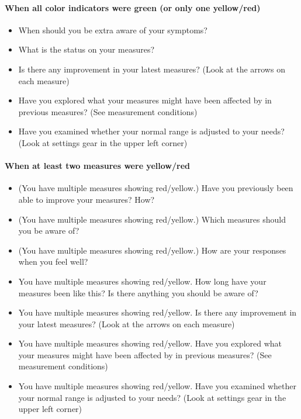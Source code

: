 \paragraph{When all color indicators were green (or only one yellow/red)}
\begin{itemize}
\item When should you be extra aware of your symptoms?
\item What is the status on your measures?
\item Is there any improvement in your latest measures? (Look at the arrows on each measure)
\item Have you explored what your measures might have been affected by in previous measures? (See measurement conditions)
\item Have you examined whether your normal range is adjusted to your needs? (Look at settings gear in the upper left corner)
\end{itemize}

\paragraph{When at least two measures were yellow/red}
\begin{itemize}
\item (You have multiple measures showing red/yellow.) Have you previously been able to improve your measures? How? 
\item (You have multiple measures showing red/yellow.) Which measures should you be aware of?
\item (You have multiple measures showing red/yellow.) How are your responses when you feel well?
\item You have multiple measures showing red/yellow. How long have your measures been like this? Is there anything you should be aware of?
\item You have multiple measures showing red/yellow. Is there any improvement in your latest measures? (Look at the arrows on each measure)
\item You have multiple measures showing red/yellow. Have you explored what your measures might have been affected by in previous measures? (See measurement conditions)
\item You have multiple measures showing red/yellow. Have you examined whether your normal range is adjusted to your needs? (Look at settings gear in the upper left corner)
\end{itemize}

